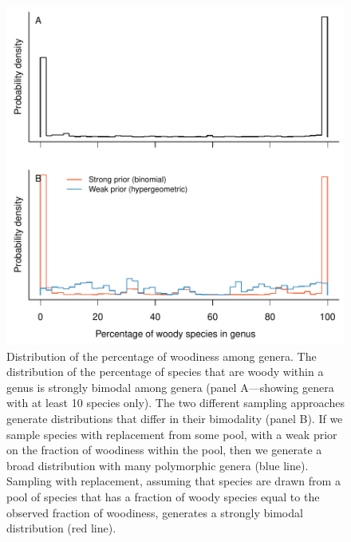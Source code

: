 \begin{figure}[p]
  \centering
  \includegraphics[width=\textwidth]{figs/fraction-by-genus}
  \caption[Distribution of woodiness proportion among genera]{Distribution of the percentage of woodiness among genera.
    The distribution of the percentage of species that are woody within
    a genus is strongly bimodal among genera (panel A---showing
    genera with at least 10 species only).
    The two different sampling approaches generate distributions that
    differ in their bimodality (panel B). If we sample species
    with replacement from some pool, with a weak prior on
    the fraction of woodiness within the pool, then we generate a broad
    distribution with many polymorphic genera (blue line).
    Sampling with replacement, assuming that species are drawn from a
    pool of species that has a fraction of woody species equal to the
    observed fraction of woodiness, generates a strongly bimodal
    distribution (red line).}
  \label{fig:distribution-genera}
\end{figure}

